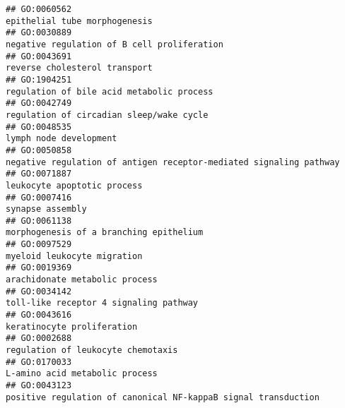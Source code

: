 \documentclass[
]{article}
\begin{document}
\begin{verbatim}
## GO:0060562                                                                                                                    epithelial tube morphogenesis
## GO:0030889                                                                                                      negative regulation of B cell proliferation
## GO:0043691                                                                                                                    reverse cholesterol transport
## GO:1904251                                                                                                        regulation of bile acid metabolic process
## GO:0042749                                                                                                         regulation of circadian sleep/wake cycle
## GO:0048535                                                                                                                           lymph node development
## GO:0050858                                                                               negative regulation of antigen receptor-mediated signaling pathway
## GO:0071887                                                                                                                      leukocyte apoptotic process
## GO:0007416                                                                                                                                 synapse assembly
## GO:0061138                                                                                                          morphogenesis of a branching epithelium
## GO:0097529                                                                                                                      myeloid leukocyte migration
## GO:0019369                                                                                                                   arachidonate metabolic process
## GO:0034142                                                                                                           toll-like receptor 4 signaling pathway
## GO:0043616                                                                                                                       keratinocyte proliferation
## GO:0002688                                                                                                               regulation of leukocyte chemotaxis
## GO:0170033                                                                                                                   L-amino acid metabolic process
## GO:0043123                                                                                   positive regulation of canonical NF-kappaB signal transduction

\end{verbatim}
\end{document}
